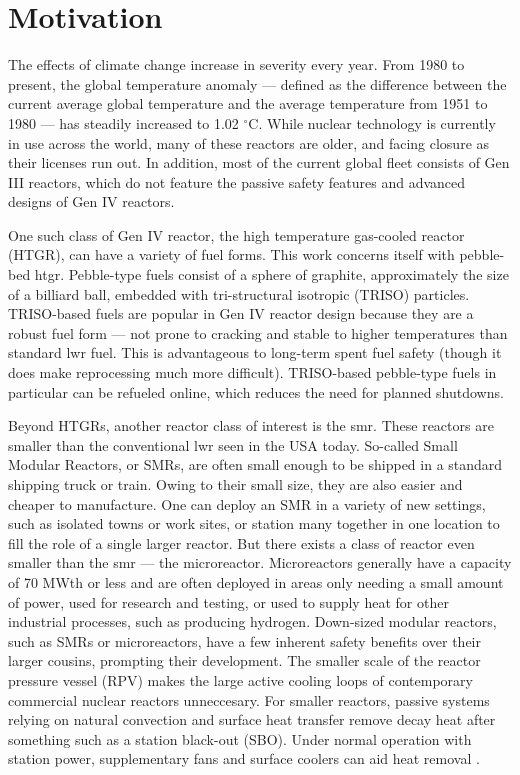 \section{Motivation}

The effects of climate change increase in severity every year. From 1980 to present, the global temperature anomaly --- defined as the difference between the current average global temperature and the average temperature from 1951 to 1980 --- has steadily increased to 1.02 $^{\circ}$C.  While nuclear technology is currently in use across the world, many of these reactors are older, and facing closure as their licenses run out.  In addition, most of the current global fleet consists of Gen III reactors, which do not feature the passive safety features and advanced designs of Gen IV reactors.

One such class of Gen IV reactor, the high temperature gas-cooled reactor (HTGR), can have a variety of fuel forms. This work concerns itself with pebble-bed \acrshort{htgr}.  Pebble-type fuels consist of a sphere of graphite, approximately the size of a billiard ball, embedded with tri-structural isotropic (TRISO) particles.  TRISO-based fuels are popular in Gen IV reactor design because they are a robust fuel form --- not prone to cracking and stable to higher temperatures than standard \acrfull{lwr} fuel.  This is advantageous to long-term spent fuel safety (though it does make reprocessing much more difficult).  TRISO-based pebble-type fuels in particular can be refueled online, which reduces the need for planned shutdowns.

Beyond HTGRs, another reactor class of interest is the \acrfull{smr}.  These reactors are smaller than the conventional \acrshort{lwr} seen in the USA today.  So-called Small Modular Reactors, or SMRs, are often small enough to be shipped in a standard shipping truck or train.  Owing to their small size, they are also easier and cheaper to manufacture.  One can deploy an SMR in a variety of new settings, such as isolated towns or work sites, or station many together in one location to fill the role of a single larger reactor.  But there exists a class of reactor even smaller than the \acrshort{smr} --- the microreactor.  Microreactors generally have a capacity of 70 MWth or less and are often deployed in areas only needing a small amount of power, used for research and testing, or used to supply heat for other industrial processes, such as producing hydrogen.  Down-sized modular reactors, such as SMRs or microreactors, have a few inherent safety benefits over their larger cousins, prompting their development.  The smaller scale of the reactor pressure vessel (RPV) makes the large active cooling loops of contemporary commercial nuclear reactors unneccesary.  For smaller reactors, passive systems relying on natural convection and surface heat transfer remove decay heat after something such as a station black-out (SBO).  Under normal operation with station power, supplementary fans and surface coolers can aid heat removal \cite{reutler_advantages_1984}.


